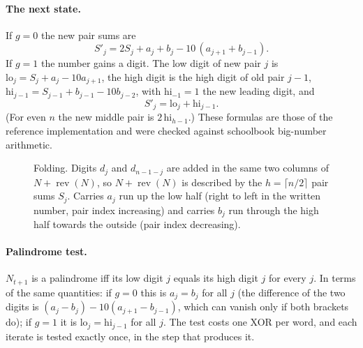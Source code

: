 \documentclass[11pt,a4paper]{article}
\newcommand{\rev}{\operatorname{rev}}
\theoremstyle{remark}
\begin{document}
\paragraph{The next state.}
If $g=0$ the new pair sums are
\begin{equation}\label{eq:nogrowth}
S'_j=2S_j+a_j+b_j-10\,(a_{j+1}+b_{j-1}).
\end{equation}
If $g=1$ the number gains a digit. The low digit of new pair $j$ is $\mathrm{lo}_j=S_j+a_j-10a_{j+1}$, the high digit is the high digit of old pair $j-1$, $\mathrm{hi}_{j-1}=S_{j-1}+b_{j-1}-10b_{j-2}$, with $\mathrm{hi}_{-1}=1$ the new leading digit, and
\begin{equation}\label{eq:growth}
S'_j=\mathrm{lo}_j+\mathrm{hi}_{j-1}.
\end{equation}
(For even $n$ the new middle pair is $2\,\mathrm{hi}_{h-1}$.) These formulas are those of the reference implementation and were checked against schoolbook big-number arithmetic.

\begin{figure}[t]
\centering
{}
\caption{Folding. Digits $d_j$ and $d_{n-1-j}$ are added in the same two columns of $N+\rev(N)$, so $N+\rev(N)$ is described by the $h=\lceil n/2\rceil$ pair sums $S_j$. Carries $a_j$ run up the low half (right to left in the written number, pair index increasing) and carries $b_j$ run through the high half towards the outside (pair index decreasing).}
\label{fig:fold}
\end{figure}

\paragraph{Palindrome test.}
$N_{t+1}$ is a palindrome iff its low digit $j$ equals its high digit $j$ for every $j$. In terms of the same quantities: if $g=0$ this is $a_j=b_j$ for all $j$ (the difference of the two digits is $(a_j-b_j)-10(a_{j+1}-b_{j-1})$, which can vanish only if both brackets do); if $g=1$ it is $\mathrm{lo}_j=\mathrm{hi}_{j-1}$ for all $j$. The test costs one XOR per word, and each iterate is tested exactly once, in the step that produces it.
\end{document}
